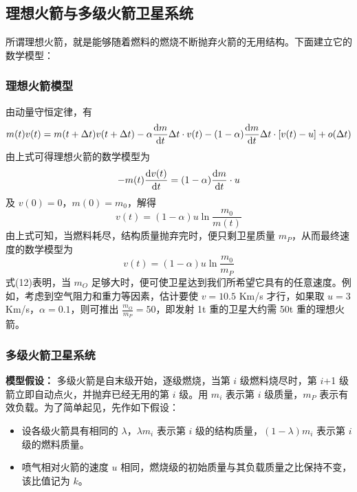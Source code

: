 \documentclass[a4,10pt,zihao=-4]{ctexart}
\begin{document}
\subsection{理想火箭与多级火箭卫星系统}

所谓理想火箭，就是能够随着燃料的燃烧不断抛弃火箭的无用结构。下面建立它的数学模型：

\subsubsection{理想火箭模型}

由动量守恒定律，有
\begin{equation*}
m(t)v(t) = m(t + \Delta t) v(t + \Delta t) - \alpha \frac{\text d m}{\text d t}\Delta t\cdot v(t) - (1-\alpha) \frac{\text d m}{\text d t}\Delta t\cdot[v(t)-u]+o(\Delta t)
\end{equation*}
由上式可得理想火箭的数学模型为
\begin{equation}
-m(t)\frac{\text d v(t)}{\text d t} = (1-\alpha)\frac{\text d m}{\text d t}\cdot u
\end{equation}
及 $v(0)= 0$，$m(0)= m_0$，解得
\begin{equation}
v(t)=(1-\alpha)u\ln \frac{m_0}{m(t)}
\end{equation}
由上式可知，当燃料耗尽，结构质量抛弃完时，便只剩卫星质量 $m_P$，从而最终速度的数学模型为
\begin{equation}
v(t)=(1-\alpha)u\ln \frac{m_0}{m_P}
\end{equation}
式(12)表明，当 $m_O$ 足够大时，便可使卫星达到我们所希望它具有的任意速度。例如，考虑到空气阻力和重力等因素，估计要使 $v = 10.5$ Km/s 才行，如果取 $u =3$ Km/s，$\alpha =0.1$，则可推出 $\frac{m_O}{m_P}=50$，即发射 1t 重的卫星大约需 50t 重的理想火箭。

\subsubsection{多级火箭卫星系统}

\textbf{模型假设：}
多级火箭是自末级开始，逐级燃烧，当第 $i$ 级燃料烧尽时，第 $i$+1 级箭立即自动点火，并抛弃已经无用的第 $i$ 级。用 $m_i$ 表示第 $i$ 级质量，$m_P$ 表示有效负载。为了简单起见，先作如下假设：

\begin{itemize}
    \item 设各级火箭具有相同的 $\lambda$，$\lambda m_i$ 表示第 $i$ 级的结构质量，$(1-\lambda) m_i$ 表示第 $i$ 级的燃料质量。
    \item 喷气相对火箭的速度 $u$ 相同，燃烧级的初始质量与其负载质量之比保持不变，该比值记为 $k$。
\end{itemize}
\end{document}
